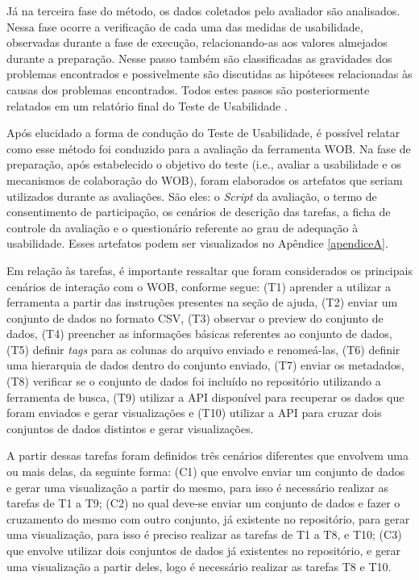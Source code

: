 Já na terceira fase do método, os dados coletados pelo avaliador são analisados. Nessa fase 
ocorre a verificação de cada uma das medidas de usabilidade, observadas durante a fase de 
execução, relacionando-as aos valores almejados durante a preparação. Nesse passo também 
são classificadas as gravidades dos problemas encontrados e possivelmente são discutidas as 
hipóteses relacionadas às causas dos problemas encontrados. Todos estes passos são 
posteriormente relatados em um relatório final do Teste de Usabilidade \cite{barbosa2010}.

Após elucidado a forma de condução do Teste de Usabilidade, é possível relatar como esse 
método foi conduzido para a avaliação da ferramenta WOB. Na fase de preparação, após 
estabelecido o objetivo do teste (i.e., avaliar a usabilidade e os mecanismos de 
colaboração do WOB), foram elaborados os artefatos que seriam utilizados durante as 
avaliações. São eles: o \textit{Script} da avaliação, o termo de consentimento de participação, 
os cenários de descrição das tarefas, a ficha de controle da avaliação e o questionário
referente ao grau de adequação à usabilidade. Esses artefatos podem ser visualizados no 
Apêndice \ref{apendiceA}.

Em relação às tarefas, é importante ressaltar que foram considerados os principais cenários 
de interação com o WOB, conforme segue: (T1) aprender a utilizar a ferramenta a partir das 
instruções presentes na seção de ajuda, (T2) enviar um conjunto de dados no formato CSV, (T3) 
observar o preview do conjunto de dados, (T4) preencher as informações básicas referentes ao 
conjunto de dados, (T5) definir \textit{tags} para as colunas do arquivo enviado e 
renomeá-las, (T6) definir uma hierarquia de dados dentro do conjunto enviado, (T7) enviar os 
metadados, (T8) verificar se o conjunto de dados foi incluído no repositório utilizando a 
ferramenta de busca, (T9) utilizar a API disponível para recuperar os dados que foram 
enviados e gerar visualizações e (T10) utilizar a API para cruzar dois conjuntos de 
dados distintos e gerar visualizações. 

A partir dessas tarefas foram definidos três cenários diferentes que envolvem uma ou mais 
delas, da seguinte forma: (C1) que envolve enviar um conjunto de dados e gerar uma 
visualização a partir do mesmo, para isso é necessário realizar as tarefas de T1 a T9; 
(C2) no qual deve-se enviar um conjunto de dados e fazer o cruzamento do mesmo com outro 
conjunto, já existente no repositório, para gerar uma visualização, para isso é 
preciso realizar as tarefas de T1 a T8, e T10; (C3) que envolve utilizar dois conjuntos de 
dados já existentes no repositório, e gerar uma visualização a partir deles, logo é 
necessário realizar as tarefas T8 e T10. 


